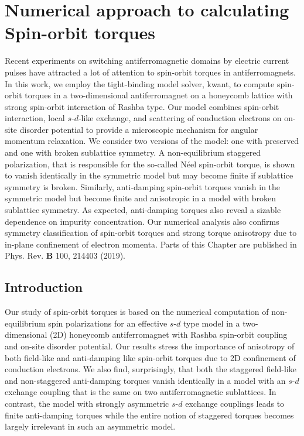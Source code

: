 \chapter{Numerical approach to calculating Spin-orbit torques} %
\label{ch:summit}
Recent experiments on switching antiferromagnetic domains by electric current pulses have attracted a lot of attention to spin-orbit torques in antiferromagnets. In this work, we employ the tight-binding model solver, kwant,  to compute spin-orbit torques in a two-dimensional antiferromagnet on a honeycomb lattice with strong spin-orbit interaction of Rashba type. Our model combines spin-orbit interaction, local $s$-$d$-like exchange, and scattering of conduction electrons on on-site disorder potential to provide a microscopic mechanism for angular momentum relaxation. We consider two versions of the model: one with preserved and one with broken sublattice symmetry. A non-equilibrium staggered polarization, that is responsible for the so-called N\'eel spin-orbit torque, is shown to vanish identically in the symmetric model but may become finite if sublattice symmetry is broken. Similarly, anti-damping spin-orbit torques vanish in the symmetric model but become finite and anisotropic in a model with broken sublattice symmetry. As expected, anti-damping torques also reveal a sizable dependence on impurity concentration. Our numerical analysis also confirms symmetry classification of spin-orbit torques and strong torque anisotropy due to in-plane confinement of electron momenta. 
\vfill
Parts of this Chapter are published in Phys. Rev. \textbf{B} 100, 214403 (2019).
\clearpage

\section{Introduction}
Our study of spin-orbit torques is based on the numerical computation of non-equilibrium spin polarizations for an effective $s$-$d$ type model in a two-dimensional (2D) honeycomb antiferromagnet with Rashba spin-orbit coupling and on-site disorder potential.  Our results stress the importance of anisotropy of both field-like and anti-damping like spin-orbit torques due to 2D confinement of conduction electrons. We also find, surprisingly, that both the staggered field-like and non-staggered anti-damping torques vanish identically in a model with an $s$-$d$ exchange coupling that is the same on two antiferromagnetic sublattices. In contrast, the model with strongly asymmetric $s$-$d$ exchange couplings leads to finite anti-damping torques while the entire notion of staggered torques becomes largely irrelevant in such an asymmetric  model. 

